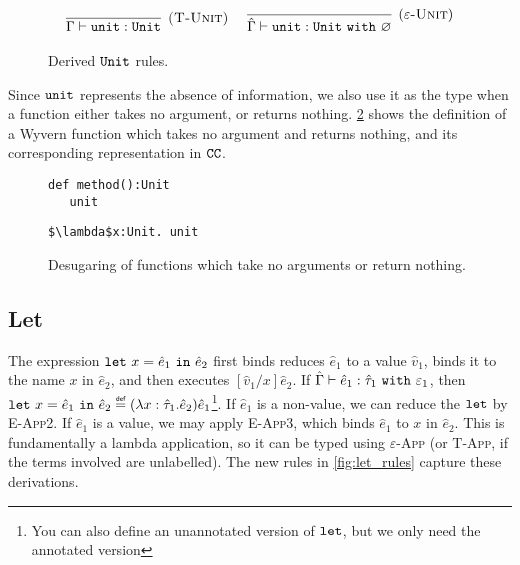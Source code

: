 \begin{figure}[h]


 \\


\[
\begin{array}{c}

\infer[\textsc{(T-Unit)}]
	{\Gamma \vdash \unit : \Unit}
	{} ~~~~

\infer[(\textsc{$\varepsilon$-Unit})]
	{\hat \Gamma \vdash \unit : \Unit~\kw{with} \varnothing}
	{}

\end{array}
\]

\caption{Derived $\mathtt{Unit}$ rules.}
\label{fig:unit_rules}
\end{figure}

Since $\mathtt{unit}$ represents the absence of information, we also use it as the type when a function either takes no argument, or returns nothing. \ref{fig:unit_sugaring} shows the definition of a Wyvern function which takes no argument and returns nothing, and its corresponding representation in $\mathtt{CC}$.

\begin{figure}[h]

\begin{lstlisting}
def method():Unit
   unit
\end{lstlisting}

\begin{lstlisting}
$\lambda$x:Unit. unit
\end{lstlisting}

\caption{Desugaring of functions which take no arguments or return nothing.}
\label{fig:unit_sugaring}
\end{figure}

\subsection{Let}

\noindent
The expression $\mathtt{let}~ x = \hat e_1~\mathtt{in}~ \hat e_2$ first binds reduces $\hat e_1$ to a value $\hat v_1$, binds it to the name $x$ in $\hat e_2$, and then executes $[\hat v_1/x]\hat e_2$. If $\hat \Gamma \vdash \hat e_1: \hat \tau_1~\mathtt{with}~ \varepsilon_1$, then $\letxpr{x}{\hat e_1}{\hat e_2} \defn (\lambda x: \hat \tau_1 . \hat e_2) \hat e_1$\footnote{You can also define an unannotated version of $\mathtt{let}$, but we only need the annotated version}. If $\hat e_1$ is a non-value, we can reduce the $\mathtt{let}$ by \textsc{E-App2}. If $\hat e_1$ is a value, we may apply \textsc{E-App3}, which binds $\hat e_1$ to $x$ in $\hat e_2$. This is fundamentally a lambda application, so it can be typed using \textsc{$\varepsilon$-App} (or \textsc{T-App}, if the terms involved are unlabelled). The new rules in \ref{fig:let_rules} capture these derivations.


